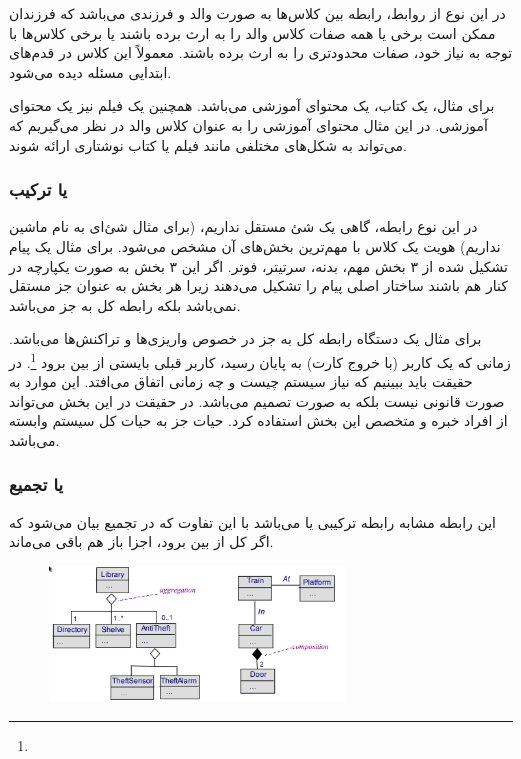 در این نوع از روابط، رابطه بین کلاس‌ها به صورت والد و فرزندی می‌باشد که فرزندان
ممکن است برخی یا همه صفات کلاس والد را به ارث برده باشند یا برخی کلاس‌ها با توجه
به نیاز خود، صفات محدودتری را به ارث برده باشند. معمولاً این کلاس در قدم‌های
ابتدایی مسئله دیده می‌شود.

برای مثال، یک کتاب، یک محتوای آموزشی می‌باشد. همچنین یک فیلم نیز یک محتوای
آموزشی. در این مثال محتوای آموزشی را به عنوان کلاس والد در نظر می‌گیریم که
می‌تواند به شکل‌های مختلفی مانند فیلم یا کتاب نوشتاری ارائه شوند.

\subsubsection{ یا ترکیب}

در این نوع رابطه، گاهی یک شئ مستقل نداریم، (برای مثال شئ‌ای به نام ماشین نداریم)
هویت یک کلاس با مهم‌ترین بخش‌های آن مشخص می‌شود. برای مثال یک پیام تشکیل شده از
۳ بخش مهم، بدنه، سرتیتر، فوتر. اگر این ۳ بخش به صورت یکپارچه در کنار هم باشند
ساختار اصلی پیام را تشکیل می‌دهند زیرا هر بخش به عنوان جز مستقل نمی‌باشد بلکه
رابطه کل به جز می‌باشد.

برای مثال  یک دستگاه  رابطه کل به جز در خصوص واریزی‌ها و
تراکنش‌ها می‌باشد. زمانی که  یک کاربر (با خروج کارت) به پایان رسید،
 کاربر قبلی بایستی از بین برود \footnote{}. در حقیقت
باید ببینیم که نیاز سیستم چیست و چه زمانی اتفاق می‌افتد. این موارد به صورت
قانونی نیست بلکه به صورت تصمیم می‌باشد. در حقیقت در این بخش می‌تواند از افراد
خبره و متخصص این بخش استفاده کرد. حیات جز به حیات کل سیستم وابسته می‌باشد.

\subsubsection{ یا تجمیع}

این رابطه مشابه رابطه ترکیبی یا  می‌باشد با این تفاوت که در
تجمیع بیان می‌شود که اگر کل از بین برود، اجزا باز هم باقی می‌ماند.

\begin{figure}[H]
    \centering
    \includegraphics[width=0.7\textwidth]{images/aggregation_relation.png}
    \caption{}
\end{figure}

